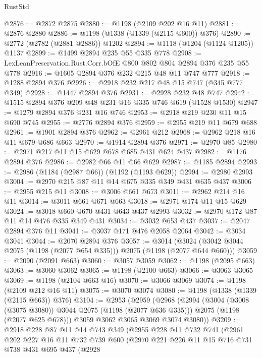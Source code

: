 \begin{lexlean}{RustStd}
\begin{coremodule}
@2876 := @2872 @2875
@2880 := @1198 (@2109 @202 @16 @11)
@2881 := @2876 @2880
@2886 := @1198 (@1338 (@1339 (@2115 @600)) @376)
@2890 := @2772 (@2782 (@2881 @2886)) @1202
@2894 := @1118 (@1204 (@1124 @1205)) @1137
@2899 := @1499 @2894 @235 @55 @335 @778
@2908 := LexLeanPreservation.Rust.Corr.bOfE @800 @802 @804 @2894 @376 @235 @55 @778
@2916 := @1605 @2894 @376 @232 @215 @48 @11 @747 @777
@2918 := @1288 @2894 @376
@2926 := @2918 @232 @217 @48 @15 @747 (@345 @777 @349)
@2928 := @1447 @2894 @376
@2931 := @2928 @232 @48 @747
@2942 := @1515 @2894 @376 @209 @48 @231 @16 @335 @746 @619 (@1528 @1530)
@2947 := @1279 @2894 @376 @231 @16 @746
@2953 := @2918 @219 @230 @11 @15 @690 @745
@2955 := @2776 @2894 @376
@2959 := @2955 @219 @11 @679 @688
@2961 := @1901 @2894 @376
@2962 := @2961 @212
@2968 := @2962 @218 @16 @11 @679 @686 @663
@2970 := @1914 @2894 @376
@2971 := @2970 @85
@2980 := @2971 @217 @11 @15 @629 @678 @685 @431 @624 @437
@2982 := @1176 @2894 @376
@2986 := @2982 @66 @11 @66 @629
@2987 := @1185 @2894
@2993 := @2986 (@1184 (@2987 @66)) (@1192 (@1193 @629))
@2994 := @2980 @2993
@3004 := @2970 @215 @87 @11 @14 @675 @335 @349 @431 @635 @437
@3006 := @2955 @215 @11
@3008 := @3006 @661 @673
@3011 := @2962 @214 @16 @11
@3014 := @3011 @661 @671 @663
@3018 := @2971 @174 @11 @15 @629
@3024 := @3018 @660 @670 @431 @643 @437 @2993
@3032 := @2970 @172 @87 @11 @14 @476 @335 @349 @431
@3034 := @3032 @653 @437
@3037 := @2047 @2894 @376 @11
@3041 := @3037 @171 @476 @2058 @2064
@3042 := @3034 @3041
@3044 := @2070 @2894 @376
@3057 := @3014 (@3024 (@3042 @3044 @2075 (@1198 (@2077 @654 @335))) @2075 (@1198 (@2077 @644 @660)))
@3059 := @2090 (@2091 @663)
@3060 := @3057 @3059
@3062 := @1198 (@2095 @663)
@3063 := @3060 @3062
@3065 := @1198 (@2100 @663)
@3066 := @3063 @3065
@3069 := @1198 (@2104 @663 @16)
@3070 := @3066 @3069
@3074 := @1198 (@2109 @212 @16 @11)
@3075 := @3070 @3074
@3080 := @1198 (@1338 (@1339 (@2115 @663)) @376)
@3104 := @2953
    (@2959
      (@2968
        (@2994
          (@3004 (@3008 (@3075 @3080)) @3044 @2075 (@1198 (@2077 @636 @335)))
          @2075
          (@1198 (@2077 @625 @678)))
        @3059
        @3062
        @3065
        @3069
        @3074
        @3080))
@3209 := @2918
    @228
    @87
    @11
    @14
    @743
    @349
    (@2955
      @228
      @11
      @732
      @741
      (@2961
        @202
        @227
        @16
        @11
        @732
        @739
        @600
        (@2970
          @221
          @226
          @11
          @15
          @716
          @731
          @738
          @431
          @695
          @437
          (@2928

\end{coremodule}
\end{lexlean}
